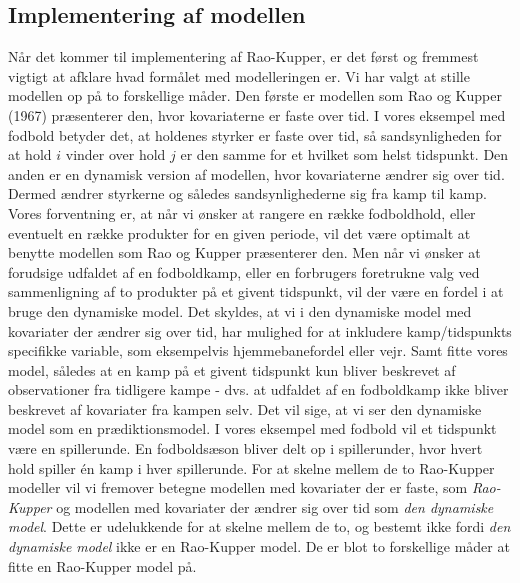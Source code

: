 \documentclass[11pt,a4paper]{article}
\begin{document}
\subsection{Implementering af modellen}
Når det kommer til implementering af Rao-Kupper, er det først og fremmest vigtigt at afklare hvad formålet med modelleringen er. Vi har valgt at stille modellen op på to forskellige måder. Den første er modellen som Rao og Kupper (1967)\cite{RaoKupper} præsenterer den, hvor kovariaterne er faste over tid. I vores eksempel med fodbold betyder det, at holdenes styrker er faste over tid, så sandsynligheden for at hold $i$ vinder over hold $j$ er den samme for et hvilket som helst tidspunkt.
Den anden er en dynamisk version af modellen, hvor kovariaterne ændrer sig over tid. Dermed ændrer styrkerne og således sandsynlighederne sig fra kamp til kamp. Vores forventning er, at når vi ønsker at rangere en række fodboldhold, eller eventuelt en række produkter for en given periode, vil det være optimalt at benytte modellen som Rao og Kupper præsenterer den. Men når vi ønsker at forudsige udfaldet af en fodboldkamp, eller en forbrugers foretrukne valg ved sammenligning af to produkter på et givent tidspunkt, vil der være en fordel i at bruge den dynamiske model. Det skyldes, at vi i den dynamiske model med kovariater der ændrer sig over tid, har mulighed for at inkludere kamp/tidspunkts specifikke variable, som eksempelvis hjemmebanefordel eller vejr. Samt fitte vores model, således at en kamp på et givent tidspunkt kun bliver beskrevet af observationer fra tidligere kampe - dvs. at udfaldet af en fodboldkamp ikke bliver beskrevet af kovariater fra kampen selv. Det vil sige, at vi ser den dynamiske model som en prædiktionsmodel.
I vores eksempel med fodbold vil et tidspunkt være en spillerunde. En fodboldsæson bliver delt op i spillerunder, hvor hvert hold spiller én kamp i hver spillerunde. For at skelne mellem de to Rao-Kupper modeller vil vi fremover betegne modellen med kovariater der er faste, som \textit{Rao-Kupper} og modellen med kovariater der ændrer sig over tid som \textit{den dynamiske model}. Dette er udelukkende for at skelne mellem de to, og bestemt ikke fordi \textit{den dynamiske model} ikke er en Rao-Kupper model. De er blot to forskellige måder at fitte en Rao-Kupper model på. 
\end{document}

